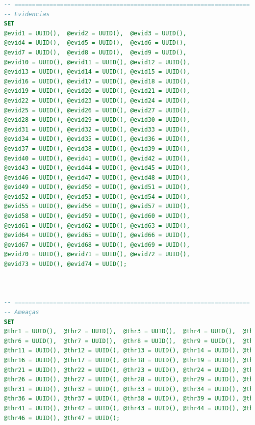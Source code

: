 \documentclass[12pt,a4paper]{report}
\begin{document}
\begin{lstlisting}[language=SQL, caption=population.sql]
-- ===================================================================
-- Evidencias
SET
@evid1 = UUID(),  @evid2 = UUID(),  @evid3 = UUID(),
@evid4 = UUID(),  @evid5 = UUID(),  @evid6 = UUID(),
@evid7 = UUID(),  @evid8 = UUID(),  @evid9 = UUID(),
@evid10 = UUID(), @evid11 = UUID(), @evid12 = UUID(),
@evid13 = UUID(), @evid14 = UUID(), @evid15 = UUID(),
@evid16 = UUID(), @evid17 = UUID(), @evid18 = UUID(),
@evid19 = UUID(), @evid20 = UUID(), @evid21 = UUID(),
@evid22 = UUID(), @evid23 = UUID(), @evid24 = UUID(),
@evid25 = UUID(), @evid26 = UUID(), @evid27 = UUID(),
@evid28 = UUID(), @evid29 = UUID(), @evid30 = UUID(),
@evid31 = UUID(), @evid32 = UUID(), @evid33 = UUID(),
@evid34 = UUID(), @evid35 = UUID(), @evid36 = UUID(),
@evid37 = UUID(), @evid38 = UUID(), @evid39 = UUID(),
@evid40 = UUID(), @evid41 = UUID(), @evid42 = UUID(),
@evid43 = UUID(), @evid44 = UUID(), @evid45 = UUID(),
@evid46 = UUID(), @evid47 = UUID(), @evid48 = UUID(),
@evid49 = UUID(), @evid50 = UUID(), @evid51 = UUID(),
@evid52 = UUID(), @evid53 = UUID(), @evid54 = UUID(),
@evid55 = UUID(), @evid56 = UUID(), @evid57 = UUID(),
@evid58 = UUID(), @evid59 = UUID(), @evid60 = UUID(),
@evid61 = UUID(), @evid62 = UUID(), @evid63 = UUID(),
@evid64 = UUID(), @evid65 = UUID(), @evid66 = UUID(),
@evid67 = UUID(), @evid68 = UUID(), @evid69 = UUID(),
@evid70 = UUID(), @evid71 = UUID(), @evid72 = UUID(),
@evid73 = UUID(), @evid74 = UUID();



-- ===================================================================
-- Ameaças
SET
@thr1 = UUID(),  @thr2 = UUID(),  @thr3 = UUID(),  @thr4 = UUID(),  @thr5 = UUID(),
@thr6 = UUID(),  @thr7 = UUID(),  @thr8 = UUID(),  @thr9 = UUID(),  @thr10 = UUID(),
@thr11 = UUID(), @thr12 = UUID(), @thr13 = UUID(), @thr14 = UUID(), @thr15 = UUID(),
@thr16 = UUID(), @thr17 = UUID(), @thr18 = UUID(), @thr19 = UUID(), @thr20 = UUID(),
@thr21 = UUID(), @thr22 = UUID(), @thr23 = UUID(), @thr24 = UUID(), @thr25 = UUID(),
@thr26 = UUID(), @thr27 = UUID(), @thr28 = UUID(), @thr29 = UUID(), @thr30 = UUID(),
@thr31 = UUID(), @thr32 = UUID(), @thr33 = UUID(), @thr34 = UUID(), @thr35 = UUID(),
@thr36 = UUID(), @thr37 = UUID(), @thr38 = UUID(), @thr39 = UUID(), @thr40 = UUID(),
@thr41 = UUID(), @thr42 = UUID(), @thr43 = UUID(), @thr44 = UUID(), @thr45 = UUID(),
@thr46 = UUID(), @thr47 = UUID();


\end{lstlisting}
\end{document}
